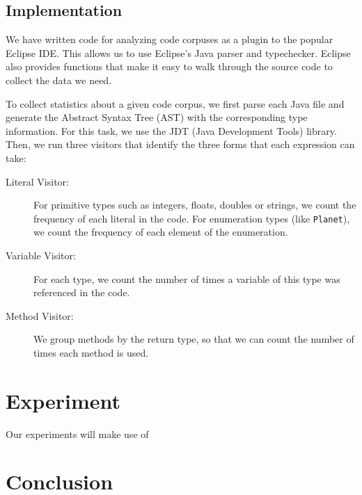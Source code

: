 \documentclass{article} %
\begin{document}
\subsection*{Implementation}

We have written code for analyzing code corpuses as a plugin to the popular Eclipse IDE. This allows us to use Eclipse's Java parser and typechecker. Eclipse also provides functions that make it easy to walk through the source code to collect the data we need.

To collect statistics about a given code corpus, we first parse each Java file and generate the Abstract Syntax Tree (AST) with the corresponding type information. For this task, we use the JDT (Java Development Tools) library. Then, we run three visitors that identify the three forms that each expression can take:

\begin{description}
   \item[Literal Visitor:] For primitive types such as integers, floats, doubles or strings, we count the frequency of each literal in the code. For enumeration types (like \texttt{Planet}), we count the frequency of each element of the enumeration.

   \item[Variable Visitor:] For each type, we count the number of times a variable of this type was referenced in the code.

   \item[Method Visitor:] We group methods by the return type, so that we can count the number of times each method is used.

\end{description}

\section*{Experiment}

Our experiments will make use of 

\section*{Conclusion}
\end{document}
